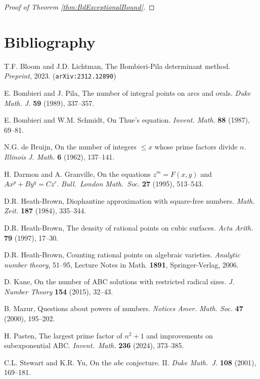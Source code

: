 \begin{proof}[Proof of Theorem \ref{thm:BdExceptionalBound}]
\end{proof}


\chapter{Bibliography}
\begin{thebibliography}{99}

T.F. Bloom and J.D. Lichtman, The Bombieri-Pila determinant method. {\em Preprint}, 2023. ({\tt arXiv:2312.12890})

E. Bombieri and J. Pila, The number of integral points on arcs and ovals. {\em Duke Math. J.} {\bf 59} (1989), 337--357.

E. Bombieri and W.M. Schmidt, On Thue's equation. {\em Invent. Math.} {\bf 88} (1987), 69--81.

N.G. de Bruijn, On the number of integers {$\leq x$} whose prime factors divide {$n$}.  {\em Illinois J. Math.} {\bf 6} (1962), {137--141}.

H. Darmon and A. Granville, On the equations $z^m=F(x,y)$ and $Ax^p+By^q=Cz^r$. {\em Bull.\ London Math.\ Soc.} {\bf 27} (1995), 513--543.

D.R. Heath-Brown, Diophantine approximation with square-free numbers.  {\em Math. Zeit.} {\bf 187} (1984), {335--344}.

D.R. Heath-Brown, The density of rational points on cubic surfaces. {\em Acta Arith.} {\bf 79} (1997), 17--30.

D.R. Heath-Brown, Counting rational points on algebraic varieties. {\em Analytic number theory}, 51--95, Lecture Notes in Math. {\bf 1891}, Springer-Verlag, 2006.

D. Kane, On the number of ABC solutions with restricted radical sizes. {\em J. Number Theory} {\bf 154} (2015), 32--43.

B. Mazur, Questions about powers of numbers. {\em Notices Amer. Math. Soc.} {\bf 47} (2000), 195--202.

H. Pasten, The largest prime factor of $n^2+1$ and improvements on subexponential ABC. {\em Invent.\ Math.} {\bf 236} (2024), 373--385.

C.L. Stewart and K.R. Yu, On the $abc$ conjecture. II. {\it Duke Math.\ J.} {\bf 108} (2001), 169--181.

\end{thebibliography}
